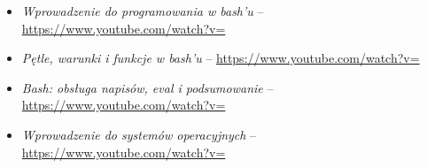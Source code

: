 % 
% 
% 
% 

\begin{itemize}
\item \emph{Wprowadzenie do programowania w bash'u} – \url{https://www.youtube.com/watch?v=}
\item \emph{Pętle, warunki i funkcje w bash'u} – \url{https://www.youtube.com/watch?v=}
\item \emph{Bash: obsługa napisów, eval i podsumowanie} – \url{https://www.youtube.com/watch?v=}
\item \emph{Wprowadzenie do systemów operacyjnych} – \url{https://www.youtube.com/watch?v=}
\end{itemize}
